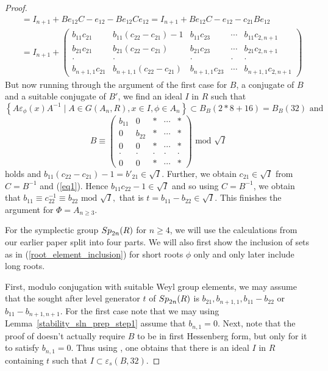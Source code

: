 \documentclass[12pt]{amsart}
\theoremstyle{definition}\newtheorem{definition}[theorem]{Definition}
\theoremstyle{remark}\newtheorem{remark}[theorem]{Remark}
\theoremstyle{definition}\newtheorem{case}{Case}
\begin{document}
\begin{proof}
\begin{align*}
&=I_{n+1}+Be_{12}C-e_{12}-Be_{12}Ce_{12}=I_{n+1}+Be_{12}C-e_{12}-c_{21}Be_{12}\\
&=I_{n+1}+
\begin{pmatrix}
b_{11}c_{21} & b_{11}(c_{22}-c_{21})-1 & b_{11}c_{23} & \cdots & b_{11}c_{2,n+1}\\
b_{21}c_{21} & b_{21}(c_{22}-c_{21}) & b_{21}c_{23} & \cdots & b_{21}c_{2,n+1}\\
\cdot & \cdot & \cdot & \cdot & \cdot\\
b_{n+1,1}c_{21} & b_{n+1,1}(c_{22}-c_{21}) & b_{n+1,1}c_{23} & \cdots & b_{n+1,1}c_{2,n+1}
\end{pmatrix}
\end{align*}
But now running through the argument of the first case for $B$, a conjugate of $B$ and a suitable conjugate of $B'$, we find an ideal $I$ in $R$ such that
\[
\left\{A\varepsilon_{\phi}(x)A^{-1}\mid A\in G(A_n,R),x\in I,\phi\in A_n\right\}\subset B_B(2*8+16)=B_B(32)\text{ and }
\]
\begin{equation}\label{eq1}
B\equiv 
\begin{pmatrix}
b_{11} & 0 & * & \cdots & *\\
0 & b_{22} & * &\cdots & *\\
0 & 0 & * & \cdots & *\\
\cdot & \cdot & \cdot & \cdot & \cdot\\
0 & 0 & * & \cdots & *
\end{pmatrix}\text{ mod }\sqrt{I}
\end{equation}
holds and $b_{11}(c_{22}-c_{21})-1=b'_{21}\in \sqrt{I}$. Further, we obtain $c_{21}\in \sqrt{I}$ from $C=B^{-1}$ and (\ref{eq1}). Hence $b_{11}c_{22}-1\in \sqrt{I}$ and so using $C=B^{-1}$, we obtain that $b_{11}\equiv c_{22}^{-1}\equiv b_{22}\text{ mod }\sqrt{I},$ that is $t=b_{11}-b_{22}\in \sqrt{I}$. This finishes the argument for $\Phi=A_{n\geq 3}.$

For the symplectic group ${\rm Sp}_{2n}(R)$ for $n\geq 4$, we will use the calculations from our earlier paper \cite{explicit_strong_bound_sp_2n} split into four parts.  We will also first show the inclusion of sets as in (\ref{root_element_inclusion}) for short roots $\phi$ only and only later include long roots.

First, modulo conjugation with suitable Weyl group elements, we may assume that the sought after level generator $t$ of ${\rm Sp}_{2n}(R)$ is $b_{21},b_{n+1,1},b_{11}-b_{22}$ or $b_{11}-b_{n+1,n+1}$. For the first case note that we may using Lemma~\ref{stability_sln_prep_step1} assume that $b_{n,1}=0.$ Next, note that the proof of \cite[Lemma~2.7]{explicit_strong_bound_sp_2n} doesn't actually require $B$ to be in first Hessenberg form, but only for it to satisfy $b_{n,1}=0.$ Thus using \cite[Lemma~2.7]{explicit_strong_bound_sp_2n}, one obtains that there is an ideal $I$ in $R$ containing $t$ such that $I\subset\varepsilon_s(B,32)$.


\end{proof}
\end{document}

